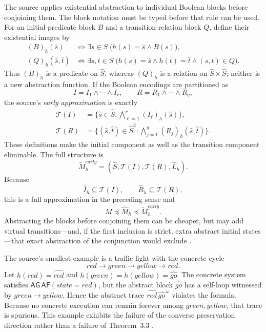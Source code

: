 The source applies existential abstraction to individual Boolean blocks before
conjoining them.  The block notation must be typed before that rule can be
used.  For an initial-predicate block \(B\) and a transition-relation block
\(Q\), define their existential images by
\[
\begin{aligned}
 (B)_h(\widehat s)
   &\iff \exists s\in S\;
      \bigl(h(s)=\widehat s\land B(s)\bigr),\\
 (Q)_h(\widehat s,\widehat t)
   &\iff \exists s,t\in S\;
      \bigl(h(s)=\widehat s\land h(t)=\widehat t
             \land (s,t)\in Q\bigr).
\end{aligned}
\]
Thus \((B)_h\) is a predicate on \(\widehat S\), whereas \((Q)_h\) is a
relation on \(\widehat S\times\widehat S\); neither is a new abstraction
function.  If the Boolean encodings are partitioned as
\[
 I=I_1\land\cdots\land I_r,
 \qquad
 R=R_1\land\cdots\land R_q,
\]
the source's \emph{early approximation} is exactly
\[
\begin{aligned}
 \mathcal T(I)
   &=\{\widehat s\in\widehat S:
       \bigwedge_{\ell=1}^{r}(I_\ell)_h(\widehat s)\},\\
 \mathcal T(R)
   &=\{(\widehat s,\widehat t)\in\widehat S^2:
       \bigwedge_{j=1}^{q}(R_j)_h(\widehat s,\widehat t)\}.
\end{aligned}
\]
These definitions make the initial component as well as the transition
component eliminable.  The full structure is
\[
 \widetilde M_h^{early}
   =(\widehat S,\mathcal T(I),\mathcal T(R),\widehat L_h).
\]
Because
\[
 \widehat I_h\subseteq\mathcal T(I),
 \qquad
 \widehat R_h\subseteq\mathcal T(R),
\]
this is a full approximation in the preceding sense and
\[
 M\preceq\widehat M_h\preceq\widetilde M_h^{early}.
\]
Abstracting the blocks before conjoining them can be cheaper, but may add virtual
transitions---and, if the first inclusion is strict, extra abstract initial
states---that exact abstraction of the conjunction would exclude
\cite[\S3.1 and thm.~3.5; pp.~763--765]{ClarkeEtAl2003}.

The source's smallest example is a traffic light with the concrete cycle
\[
 red\longrightarrow green\longrightarrow yellow\longrightarrow red.
\]
Let \(h(red)=\widehat{red}\) and
\(h(green)=h(yellow)=\widehat{go}\).  The concrete system satisfies
\(\mathsf{AG\,AF}(state=red)\), but the abstract block
\(\widehat{go}\) has a self-loop witnessed by \(green\to yellow\).  Hence the
abstract trace
\(\widehat{red}\,\widehat{go}^{\,\omega}\) violates the formula.  Because no
concrete execution can remain forever among \(green,yellow\), that trace is
spurious.  This example exhibits the failure of the converse preservation
direction rather than a failure of Theorem~3.3
\cite[ex.~3.4 and fig.~2]{ClarkeEtAl2003}.

